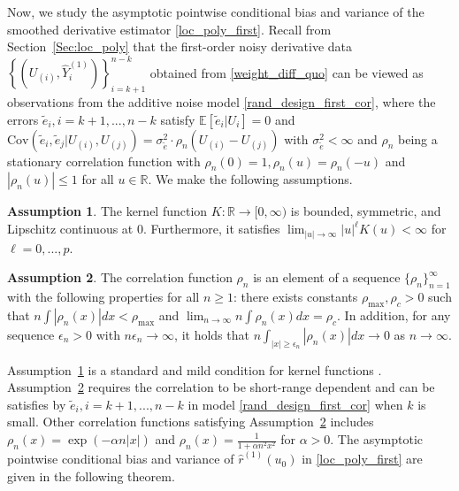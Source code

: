 \documentclass{uwstat572}
\theoremstyle{definition}
\newtheorem{assump}{Assumption}
\renewcommand{\hat}{\widehat}
\renewcommand{\tilde}{\widetilde}
\theoremstyle{theorem}
\begin{document}
Now, we study the asymptotic pointwise conditional bias and variance of the smoothed derivative estimator \eqref{loc_poly_first}. Recall from Section~\ref{Sec:loc_poly} that the first-order noisy derivative data $\left\{\left(U_{(i)},\hat{Y}_i^{(1)}\right)\right\}_{i=k+1}^{n-k}$ obtained from \eqref{weight_diff_quo} can be viewed as observations from the additive noise model \eqref{rand_design_first_cor}, where the errors $\tilde{e}_i, i=k+1,...,n-k$ satisfy $\mathbb{E}\left[\tilde{e}_i|U_i\right]=0$ and $\mathrm{Cov}\left(\tilde{e}_i,\tilde{e}_j | U_{(i)},U_{(j)} \right) = \sigma_{\tilde{e}}^2 \cdot \rho_n(U_{(i)}-U_{(j)})$ with $\sigma_{\tilde{e}}^2 <\infty$ and $\rho_n$ being a stationary correlation function with $\rho_n(0)=1, \rho_n(u) = \rho_n(-u)$ and $|\rho_n(u)|\leq 1$ for all $u\in \mathbb{R}$. We make the following assumptions.
\begin{assump}
\label{assump:kernel}
The kernel function $K:\mathbb{R}\to [0,\infty)$ is bounded, symmetric, and Lipschitz continuous at 0. Furthermore, it satisfies $\lim_{|u|\to \infty} |u|^{\ell} K(u) <\infty$ for $\ell=0,...,p$.
\end{assump}
\begin{assump}
\label{assump:cor_func}
The correlation function $\rho_n$ is an element of a sequence $\{\rho_n\}_{n=1}^{\infty}$ with the following properties for all $n\geq 1$: there exists constants $\rho_{\max}, \rho_c >0$ such that $n\int |\rho_n(x)| dx < \rho_{\max}$ and $\lim_{n\to \infty} n \int \rho_n(x) dx =\rho_c$. In addition, for any sequence $\epsilon_n>0$ with $n\epsilon_n\to \infty$, it holds that $n\int_{|x|\geq \epsilon_n} |\rho_n(x)| dx \to 0$ as $n\to \infty$. 
\end{assump}

Assumption~\ref{assump:kernel} is a standard and mild condition for kernel functions \citep{wasserman2006all}. Assumption~\ref{assump:cor_func} requires the correlation to be short-range dependent \citep{opsomer2001nonparametric} and can be satisfies by $\tilde{e}_i,i=k+1,...,n-k$ in model \eqref{rand_design_first_cor} when $k$ is small. Other correlation functions satisfying Assumption~\ref{assump:cor_func} includes $\rho_n(x) = \exp\left(-\alpha n |x|\right)$ and $\rho_n(x)=\frac{1}{1+\alpha n^2 x^2}$ for $\alpha >0$. The asymptotic pointwise conditional bias and variance of $\hat{r}^{(1)}(u_0)$ in \eqref{loc_poly_first} are given in the following theorem.
\end{document}
